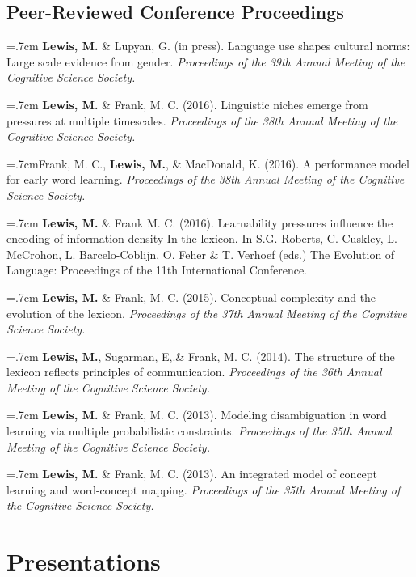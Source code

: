 \documentclass[letterpaper]{article}
\begin{document}
  
  \subsection*{Peer-Reviewed Conference Proceedings} 
    \hangindent=.7cm {\bf Lewis, M.} \& Lupyan, G. (in press). Language use shapes cultural norms: Large scale evidence from gender.  { \it Proceedings of the 39th Annual Meeting of the Cognitive Science Society.}

  \hangindent=.7cm {\bf Lewis, M.} \& Frank, M. C. (2016). Linguistic niches emerge from pressures at multiple timescales. { \it Proceedings of the 38th Annual Meeting of the Cognitive Science Society.}

   \hangindent=.7cmFrank, M. C.,  {\bf Lewis, M.}, \& MacDonald, K. (2016). A performance model for early word learning.  { \it Proceedings of the 38th Annual Meeting of the Cognitive Science Society.}

  \hangindent=.7cm {\bf Lewis, M.} \& Frank M. C. (2016). Learnability pressures influence the encoding of information density In the lexicon. In S.G. Roberts, C. Cuskley, L. McCrohon, L. Barcelo-Coblijn, O. Feher \& T. Verhoef (eds.) The Evolution of Language: Proceedings of the 11th International Conference.


 \hangindent=.7cm {\bf Lewis, M.} \& Frank, M. C. (2015). Conceptual complexity and the evolution of the lexicon. { \it Proceedings of the 37th Annual Meeting of the Cognitive Science Society.}
 
 \hangindent=.7cm {\bf Lewis, M.}, Sugarman, E,.\& Frank, M. C. (2014). The structure of the lexicon reflects principles of communication. { \it Proceedings of the 36th Annual Meeting of the Cognitive Science Society.}
  
 \hangindent=.7cm {\bf Lewis, M.} \& Frank, M. C. (2013). Modeling disambiguation in word learning via multiple probabilistic constraints. { \it Proceedings of the 35th Annual Meeting of the Cognitive Science Society.}

 \hangindent=.7cm {\bf Lewis, M.} \& Frank, M. C. (2013). An integrated model of concept learning and word-concept mapping.{ \it Proceedings of the 35th Annual Meeting of the Cognitive Science Society.}
 
 \singlespacing
 
\section*{Presentations}
\onehalfspacing
\end{document}
